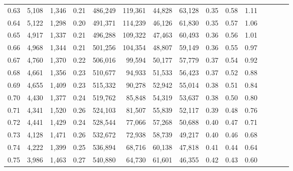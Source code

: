 \begin{tabular}{rrrcrrrrrrrrrrr}
0.63 &   5,108 &   1,346 &                                       0.21 &  486,249 &  119,361 &   44,828 &   63,128 &  0.35 &  0.58 &                         1.11 \\
0.64 &   5,122 &   1,298 &                                       0.20 &  491,371 &  114,239 &   46,126 &   61,830 &  0.35 &  0.57 &                         1.06 \\
0.65 &   4,917 &   1,337 &                                       0.21 &  496,288 &  109,322 &   47,463 &   60,493 &  0.36 &  0.56 &                         1.01 \\
0.66 &   4,968 &   1,344 &                                       0.21 &  501,256 &  104,354 &   48,807 &   59,149 &  0.36 &  0.55 &                         0.97 \\
0.67 &   4,760 &   1,370 &                                       0.22 &  506,016 &   99,594 &   50,177 &   57,779 &  0.37 &  0.54 &                         0.92 \\
0.68 &   4,661 &   1,356 &                                       0.23 &  510,677 &   94,933 &   51,533 &   56,423 &  0.37 &  0.52 &                         0.88 \\
0.69 &   4,655 &   1,409 &                                       0.23 &  515,332 &   90,278 &   52,942 &   55,014 &  0.38 &  0.51 &                         0.84 \\
0.70 &   4,430 &   1,377 &                                       0.24 &  519,762 &   85,848 &   54,319 &   53,637 &  0.38 &  0.50 &                         0.80 \\
0.71 &   4,341 &   1,520 &                                       0.26 &  524,103 &   81,507 &   55,839 &   52,117 &  0.39 &  0.48 &                         0.76 \\
0.72 &   4,441 &   1,429 &                                       0.24 &  528,544 &   77,066 &   57,268 &   50,688 &  0.40 &  0.47 &                         0.71 \\
0.73 &   4,128 &   1,471 &                                       0.26 &  532,672 &   72,938 &   58,739 &   49,217 &  0.40 &  0.46 &                         0.68 \\
0.74 &   4,222 &   1,399 &                                       0.25 &  536,894 &   68,716 &   60,138 &   47,818 &  0.41 &  0.44 &                         0.64 \\
0.75 &   3,986 &   1,463 &                                       0.27 &  540,880 &   64,730 &   61,601 &   46,355 &  0.42 &  0.43 &                         0.60 \\

\end{tabular}
